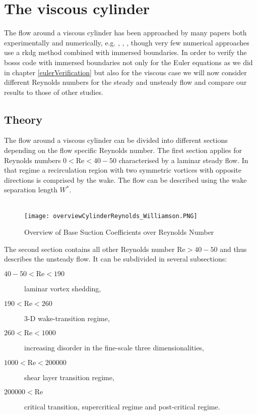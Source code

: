 \chapter{The viscous cylinder}
\label{viscousCylinder}
The flow around a viscous cylinder has been approached by many papers both experimentally and numerically, e.g. \cite{williamson1996vortex}, \cite{FLM:14223}, \cite{canutoTaira}, though very few numerical approaches use a \gls{rkdg} method combined with immersed boundaries. In order to verify the \gls{bosss} code with immersed boundaries not only for the Euler equations as we did in chapter \ref{eulerVerification} but also for the viscous case we will now consider different Reynolds numbers for the steady and unsteady flow and compare our results to those of other studies.

\section{Theory}
	The flow around a viscous cylinder can be divided into different sections depending on the flow specific Reynolds number. The first section applies for Reynolds numbers $0 < \text{Re} < 40-50$ characterised by a laminar steady flow. In that regime a recirculation region with two symmetric vortices with opposite directions is comprised by the wake. The flow can be described using the wake separation length $W^*$.\\\\
	\begin{figure}[htp]
		\centering
		\texttt{[image: overviewCylinderReynolds\_Williamson.PNG]}
		\caption{Overview of Base Suction Coefficients over Reynolds Number \cite{williamson1996vortex}}
		\label{fig:overview}
	\end{figure} 
	The second section contains all other Reynolds number $\text{Re}> 40-50$ and thus describes the unsteady flow. It can be subdivided in several subsections:
	\begin{description}
		\item[$40-50 < \text{Re} < 190$] laminar vortex shedding,
		\item[$190 < \text{Re} < 260$] 3-D wake-transition regime,
		\item[$260 < \text{Re} < 1000$] increasing disorder in the fine-scale three dimensionalities,
		\item[$1000 < \text{Re} < 200000$] shear layer transition regime,
		\item[$200000 < \text{Re}$] critical transition, supercritical regime and post-critical regime.
	\end{description}
	
